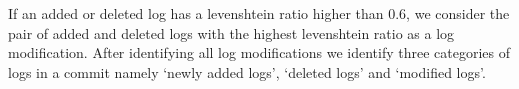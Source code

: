 If an added or deleted log has a levenshtein ratio higher than 0.6, we consider the pair of added and deleted logs with the highest levenshtein ratio as a log modification. After identifying all log modifications we identify three categories of logs in a commit namely `newly added logs', `deleted logs' and `modified logs'.

